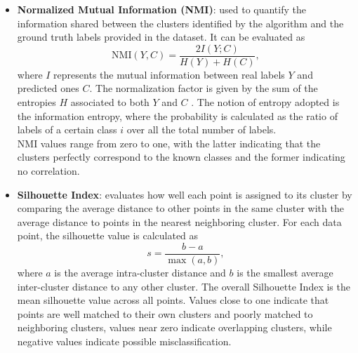 \documentclass[prl,twocolumn]{revtex4-1}
\begin{document}
\begin{itemize}[leftmargin=0pt, itemsep=0pt]
    \item[] \textbf{Normalized Mutual Information (NMI)}:
    used to quantify the information shared between the clusters identified by the algorithm and the ground truth labels provided in the dataset.
    It can be evaluated as 
    \begin{equation}
        \mathrm{NMI}(Y,C)=\frac{2I(Y;C)}{H(Y)+H(C)},
    \end{equation}
    where $I$ represents the mutual information between real labels $Y$ and predicted ones $C$. The normalization factor is given by the sum of the entropies $H$ associated to both $Y$ and $C$ \cite{vinh2010information}.
    The notion of entropy adopted is the information entropy, where the probability is calculated as the ratio of labels of a certain class $i$ over all the total number of labels. \\
    NMI values range from zero to one, with the latter indicating that the clusters perfectly correspond to the known classes and the former indicating no correlation.
    
    \item[] \textbf{Silhouette Index}:
    evaluates how well each point is assigned to its cluster by comparing the average distance to other points in the same cluster with the average distance to points in the nearest neighboring cluster.
    For each data point, the silhouette value is calculated as 
    \begin{equation}
        s = \frac{b - a}{\max(a, b)},
    \end{equation}
    where $a$ is the average intra-cluster distance and $b$ is the smallest average inter-cluster distance to any other cluster.
    The overall Silhouette Index is the mean silhouette value across all points.
	Values close to one indicate that points are well matched to their own clusters and poorly matched to neighboring clusters, values near zero indicate overlapping clusters, while negative values indicate possible misclassification.
    

\end{itemize}
\end{document}
